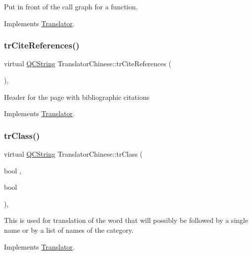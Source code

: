 Put in front of the call graph for a function. 

Implements \mbox{\hyperlink{class_translator}{Translator}}.

\mbox{\label{class_translator_chinese_aa3bc2248a7f54c1b56d2b584b22de519}} 
\subsubsection{\texorpdfstring{trCiteReferences()}{trCiteReferences()}}
{\footnotesize\ttfamily virtual \mbox{\hyperlink{class_q_c_string}{Q\+C\+String}} Translator\+Chinese\+::tr\+Cite\+References (\begin{DoxyParamCaption}{ }\end{DoxyParamCaption})\hspace{0.3cm}{\ttfamily [inline]}, {\ttfamily [virtual]}}

Header for the page with bibliographic citations 

Implements \mbox{\hyperlink{class_translator}{Translator}}.

\mbox{\label{class_translator_chinese_ac8b43380d40165fb7f6f6e8baff04e3f}} 
\subsubsection{\texorpdfstring{trClass()}{trClass()}}
{\footnotesize\ttfamily virtual \mbox{\hyperlink{class_q_c_string}{Q\+C\+String}} Translator\+Chinese\+::tr\+Class (\begin{DoxyParamCaption}\item[{bool}]{,  }\item[{bool}]{ }\end{DoxyParamCaption})\hspace{0.3cm}{\ttfamily [inline]}, {\ttfamily [virtual]}}

This is used for translation of the word that will possibly be followed by a single name or by a list of names of the category. 

Implements \mbox{\hyperlink{class_translator}{Translator}}.

\mbox{\label{class_translator_chinese_a215d5da2d3add599b154cf3d53e2ddda}} 
